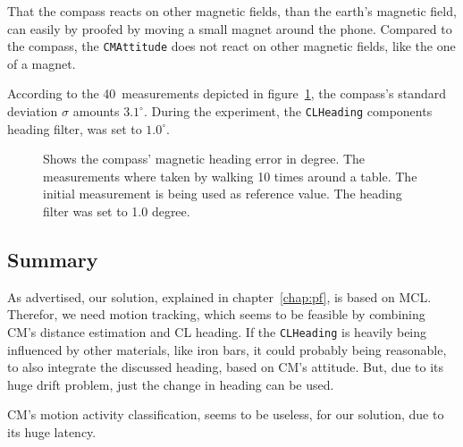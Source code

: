 That the compass reacts on other magnetic fields, than the earth's magnetic field, can easily by proofed by moving a small magnet around the phone. Compared to the compass, the \texttt{CMAttitude} does not react on other magnetic fields, like the one of a magnet.

According to the 40~measurements depicted in figure~\ref{fig:eval:compass}, the compass's standard deviation $\sigma$ amounts $3.1^{\circ}$. During the experiment, the \texttt{CLHeading} components heading filter, was set to $1.0^{\circ}$.

\begin{figure}[htbp]

  \caption{Shows the compass' magnetic heading error in degree. The measurements where taken by walking 10 times around a table. The initial measurement is being used as reference value. The heading filter was set to 1.0 degree.}
  \label{fig:eval:compass}
\end{figure}

\subsection{Summary}
As advertised, our solution, explained in chapter~\ref{chap:pf}, is based on \ac{MCL}. Therefor, we need motion tracking, which seems to be feasible by combining \ac{CM}'s distance estimation and \ac{CL} heading. If the \texttt{CLHeading} is heavily being influenced by other materials, like iron bars, it could probably being reasonable, to also integrate the discussed heading, based on \ac{CM}'s attitude. But, due to its huge drift problem, just the change in heading can be used.

\ac{CM}'s motion activity classification, seems to be useless, for our solution, due to its huge latency.